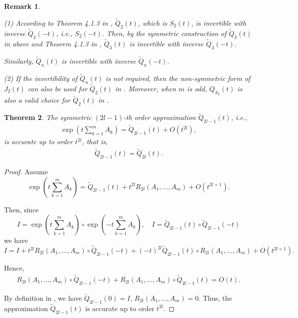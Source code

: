 \documentclass{article}
\theoremstyle{plain} %
\newtheorem{thm}{Theorem}[section]
\newtheorem{rmk}[thm]{Remark}
\numberwithin{equation}{section}
\begin{document}
\begin{rmk}\label{rmk:inverterbility:symmetric}


{\rm (1)} 
According to Theorem {\rm4.1.3} in {\rm \cite{cabrera:rodriguez:2014:non}}, $\widetilde{Q}_2(t)$, which is $S_2(t)$, is invertible with inverse $\displaystyle \widetilde{Q}_2(-t)$, i.e., $S_2(-t)$. Then, by the symmetric construction of $\widetilde{Q}_3(t)$ in {\rm {}} above and Theorem {\rm4.1.3} in {\rm \cite{cabrera:rodriguez:2014:non}}, $\widetilde{Q}_3(t)$ is invertible with inverse $\displaystyle \widetilde{Q}_3(-t)$. 

Similarly, $\widetilde{Q}_n(t)$ is invertible with inverse $\displaystyle \widetilde{Q}_n(-t)$. 

{\rm (2)} If the invertibility of $\widetilde{Q}_n(t)$ is not required, then the non-symmetric form of $J_2(t)$ can also be used for $\widetilde{Q}_2(t)$ in {\rm {}}. Moreover, when $m$ is odd, $Q_{S_2}(t)$ is also a valid choice for $\widetilde{Q}_2(t)$ in {\rm {}}.


\end{rmk}











\begin{thm}\label{thm:Trotter:higher:symmetry:JordanBanach}
The symmetric $(2l-1)$-th order approximation $\widetilde{Q}_{2l-1}(t)$, i.e., 
 \begin{align*}
       \exp\left(t\sum_{k=1}^m A_k\right) = \widetilde{Q}_{2l-1}(t) + O(t^{2l}),
    \end{align*}
is accurate up to order $t^{2l}$, that is, 
    \begin{align*}
   \widetilde{Q}_{2l-1}(t) = \widetilde{Q}_{2l}(t).
    \end{align*}
\end{thm}

\begin{proof}
Assume
\[
\exp\left(t\sum_{k=1}^m A_k\right) = \widetilde{Q}_{2l-1}(t) + t^{2l} R_{2l}(A_1, \dots, A_m) + O(t^{2l+1}).
\]

Then, since
\[
I= \exp\left(t\sum_{k=1}^m A_k\right) \circ \exp\left(-t\sum_{k=1}^m A_k\right),\quad I=\widetilde{Q}_{2l-1}(t)\circ \widetilde{Q}_{2l-1}(-t) 
\]
we have
\[I=I+t^{2l} R_{2l}(A_1,\dots, A_m)\circ \widetilde{Q}_{2l-1}(-t)+(-t)^{2l}\widetilde{Q}_{2l-1}(t)\circ R_{2l}(A_1,\dots, A_m)+O(t^{2l+1}). \]

Hence,
\begin{align*}
R_{2l}(A_1, \dots, A_m) \circ \widetilde{Q}_{2l-1}(-t) + R_{2l}(A_1, \dots, A_m) \circ \widetilde{Q}_{2l-1}(t) = O(t).
\end{align*}

By definition in , we have $\widetilde{Q}_{2l-1}(0) = I$, $\displaystyle R_{2l}(A_1, \dots, A_m)=0.$
Thus, the approximation $\widetilde{Q}_{2l-1}(t)$ is accurate up to order $t^{2l}$.
\end{proof}
\end{document}
